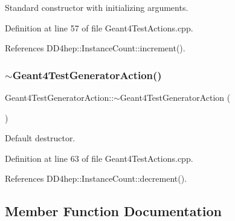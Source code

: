 Standard constructor with initializing arguments. 



Definition at line 57 of file Geant4\+Test\+Actions.\+cpp.



References D\+D4hep\+::\+Instance\+Count\+::increment().

\hypertarget{class_d_d4hep_1_1_simulation_1_1_test_1_1_geant4_test_generator_action_a41570e16f5e7aa86d68cf44764feb852}{}\label{class_d_d4hep_1_1_simulation_1_1_test_1_1_geant4_test_generator_action_a41570e16f5e7aa86d68cf44764feb852} 
\subsubsection{\texorpdfstring{$\sim$\+Geant4\+Test\+Generator\+Action()}{~Geant4TestGeneratorAction()}}
{\footnotesize\ttfamily Geant4\+Test\+Generator\+Action\+::$\sim$\+Geant4\+Test\+Generator\+Action (\begin{DoxyParamCaption}{ }\end{DoxyParamCaption})\hspace{0.3cm}{\ttfamily [virtual]}}



Default destructor. 



Definition at line 63 of file Geant4\+Test\+Actions.\+cpp.



References D\+D4hep\+::\+Instance\+Count\+::decrement().



\subsection{Member Function Documentation}
\hypertarget{class_d_d4hep_1_1_simulation_1_1_test_1_1_geant4_test_generator_action_af50b716c4764ffa0bf42c4b01ee3d394}{}\label{class_d_d4hep_1_1_simulation_1_1_test_1_1_geant4_test_generator_action_af50b716c4764ffa0bf42c4b01ee3d394} 
